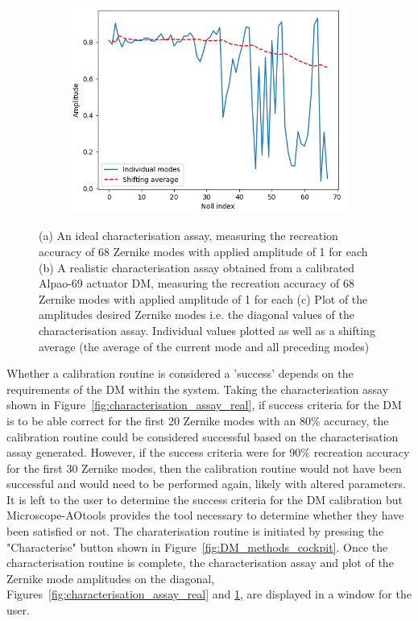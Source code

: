 \begin{figure}[h]
	\begin{subfigure}{0.9\textwidth}
		\centering
		\includegraphics[width=0.5\linewidth, scale=0.5]{./images/characterisation_assay_real_diag_and_avg.png}
		\caption{}
		\label{fig:characterisation_assay_ideal_diag_and_avg}
	\end{subfigure}
	\caption{(a) An ideal characterisation assay, measuring the recreation accuracy of 68 Zernike modes with applied amplitude of 1 for each (b) A realistic characterisation assay obtained from a calibrated Alpao-69 actuator DM, measuring the recreation accuracy of 68 Zernike modes with applied amplitude of 1 for each (c) Plot of the amplitudes desired Zernike modes i.e. the diagonal values of the characterisation assay. Individual values plotted as well as a shifting average (the average of the current mode and all preceding modes)}
	\label{fig:characterisation_assay_results}
\end{figure}

Whether a calibration routine is considered a 'success' depends on the requirements of the DM within the system. Taking the characterisation assay shown in Figure~\ref{fig:characterisation_assay_real}, if success criteria for the DM is to be able correct for the first 20 Zernike modes with an 80\% accuracy, the calibration routine could be considered successful based on the characterisation assay generated. However, if the success criteria were for 90\% recreation accuracy for the first 30 Zernike modes, then the calibration routine would not have been successful and would need to be performed again, likely with altered parameters. It is left to the user to determine the success criteria for the DM calibration but Microscope-AOtools provides the tool necessary to determine whether they have been satisfied or not. The charaterisation routine is initiated by pressing the "Characterise" button shown in Figure~\ref{fig:DM_methods_cockpit}. Once the characterisation routine is complete, the characterisation assay and plot of the Zernike mode amplitudes on the diagonal, Figures~\ref{fig:characterisation_assay_real} and \ref{fig:characterisation_assay_ideal_diag_and_avg}, are displayed in a window for the user.

